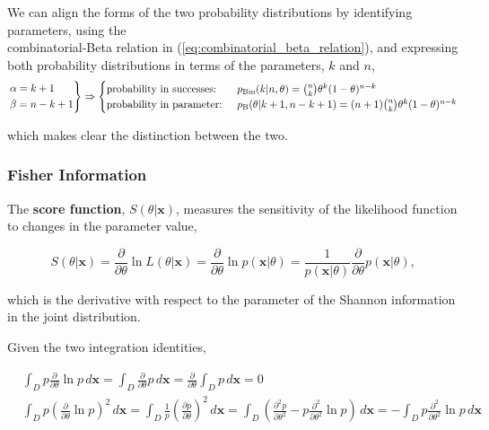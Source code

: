 \documentclass[12pt, twoside, draft]{article}
\begin{document}
We can align the forms of the two probability distributions by identifying parameters, using the \\ combinatorial-Beta relation in (\ref{eq:combinatorial_beta_relation}), and expressing both probability distributions in terms of the parameters, $k$ and $n$,
\begin{equation}
\begin{rcases}
\alpha = k + 1 \\
\beta = n - k + 1
\end{rcases} \Rightarrow
\begin{cases}
\text{probability in successes: } &  p_{\operatorname{Bin}}(k | n, \theta) = \binom{n}{k} \theta^k (1-\theta)^{n-k} \\
\text{probability in parameter: } & p_{\operatorname{B}}(\theta | k + 1, n - k + 1) = (n + 1) \binom{n}{k} \theta^{k} (1-\theta)^{n-k}
\end{cases}
\end{equation}

which makes clear the distinction between the two.

\subsubsection{Fisher Information}\label{sec:Fisher_information}

The \textbf{score function}, $S(\theta | \mathbf{x})$, measures the sensitivity of the likelihood function to changes in the parameter value,

\begin{equation}
S(\theta | \mathbf{x}) = \frac{\partial}{\partial \theta} \ln L(\theta | \mathbf{x}) = \frac{\partial}{\partial \theta} \ln p(\mathbf{x} | \theta) = \frac{1}{p(\mathbf{x} | \theta)} \frac{\partial}{\partial \theta} p(\mathbf{x} | \theta),
\end{equation}

which is the derivative with respect to the parameter of the Shannon information in the joint distribution.

Given the two integration identities,

\begin{align}
&\int_D p \frac{\partial}{\partial \theta} \ln p\,d\mathbf{x} = \int_D \frac{\partial}{\partial \theta} p\,d\mathbf{x} = \frac{\partial}{\partial \theta} \int_D p\,d\mathbf{x} = 0 \\
&\int_D p \left( \frac{\partial}{\partial \theta} \ln p \right)^2\,d\mathbf{x} = \int_D \frac{1}{p} \left( \frac{\partial p}{\partial \theta} \right)^2\,d\mathbf{x} = \int_D \left( \frac{\partial^2 p}{\partial \theta^2} - p \frac{\partial^2}{\partial \theta^2} \ln p \right)\,d\mathbf{x} = -\int_D p \frac{\partial^2}{\partial \theta^2} \ln p\,d\mathbf{x}
\end{align}
\end{document}

